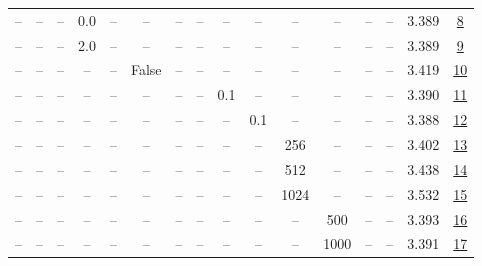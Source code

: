 \begin{table}[H]
\begin{tabular}{cccccccccccccccc}
-- & -- & -- & 0.0 & -- & -- & -- & -- & -- & -- & -- & -- & -- & -- & 3.389 & \href{https://wandb.ai/stanford-mercury/optimizer-scaling/runs/sweep-130m-5B-kron4df384lr0.002-wd0.5-b10.95-plr0.2-pis1-gn0.0-n-447d9f}{8} \\
-- & -- & -- & 2.0 & -- & -- & -- & -- & -- & -- & -- & -- & -- & -- & 3.389 & \href{https://wandb.ai/stanford-mercury/optimizer-scaling/runs/sweep-130m-5B-krondd6d9blr0.002-wd0.5-b10.95-plr0.2-pis1-gn2.0-n-552b0d}{9} \\
-- & -- & -- & -- & -- & False & -- & -- & -- & -- & -- & -- & -- & -- & 3.419 & \href{https://wandb.ai/stanford-mercury/optimizer-scaling/runs/sweep-130m-5B-krone5b648lr0.002-wd0.5-b10.95-plr0.2-pis1-gn1-nor-3d80f2}{10} \\
-- & -- & -- & -- & -- & -- & -- & -- & 0.1 & -- & -- & -- & -- & -- & 3.390 & \href{https://wandb.ai/stanford-mercury/optimizer-scaling/runs/sweep-130m-5B-kronb4e3a9lr0.002-wd0.5-b10.95-plr0.1-pis1-gn1-nor-b5c63e}{11} \\
-- & -- & -- & -- & -- & -- & -- & -- & -- & 0.1 & -- & -- & -- & -- & 3.388 & \href{https://wandb.ai/stanford-mercury/optimizer-scaling/runs/sweep-130m-5B-kron856f4elr0.002-wd0.5-b10.95-plr0.2-pis1-gn1-nor-9bbacc}{12} \\
-- & -- & -- & -- & -- & -- & -- & -- & -- & -- & 256 & -- & -- & -- & 3.402 & \href{https://wandb.ai/stanford-mercury/optimizer-scaling/runs/sweep-130m-5B-kronf8119alr0.002-wd0.5-b10.95-plr0.2-pis1-gn1-nor-73cf68}{13} \\
-- & -- & -- & -- & -- & -- & -- & -- & -- & -- & 512 & -- & -- & -- & 3.438 & \href{https://wandb.ai/stanford-mercury/optimizer-scaling/runs/sweep-130m-5B-kron80879elr0.002-wd0.5-b10.95-plr0.2-pis1-gn1-nor-57a36a}{14} \\
-- & -- & -- & -- & -- & -- & -- & -- & -- & -- & 1024 & -- & -- & -- & 3.532 & \href{https://wandb.ai/stanford-mercury/optimizer-scaling/runs/sweep-130m-5B-kron897453lr0.002-wd0.5-b10.95-plr0.2-pis1-gn1-nor-92b5b8}{15} \\
-- & -- & -- & -- & -- & -- & -- & -- & -- & -- & -- & 500 & -- & -- & 3.393 & \href{https://wandb.ai/stanford-mercury/optimizer-scaling/runs/sweep-130m-5B-kron5226b3lr0.002-wd0.5-b10.95-plr0.2-pis1-gn1-nor-49e5be}{16} \\
-- & -- & -- & -- & -- & -- & -- & -- & -- & -- & -- & 1000 & -- & -- & 3.391 & \href{https://wandb.ai/stanford-mercury/optimizer-scaling/runs/sweep-130m-5B-kron0c9405lr0.002-wd0.5-b10.95-plr0.2-pis1-gn1-nor-d2903e}{17} \\

\end{tabular}
\end{table}
